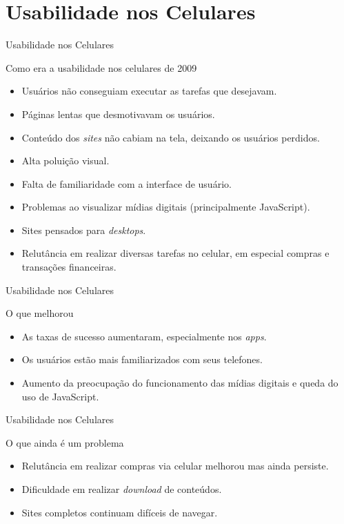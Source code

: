\section{Usabilidade nos Celulares}

\begin{frame}{Usabilidade nos Celulares}{}
\begin{block}{Como era a usabilidade nos celulares de 2009}
  \begin{itemize}
    \item<1-> Usuários não conseguiam executar as tarefas que desejavam.
    \item<2-> Páginas lentas que desmotivavam os usuários.
    \item<3-> Conteúdo dos \emph{sites} não cabiam na tela, deixando os usuários perdidos.
    \item<4-> Alta poluição visual.
    \item<5-> Falta de familiaridade com a interface de usuário.
    \item<6-> Problemas ao visualizar mídias digitais (principalmente \alert{JavaScript}).
    \item<7-> Sites pensados para \emph{desktops}.
    \item<8-> Relutância em realizar diversas tarefas no celular, em especial \alert{compras} e \alert{transações financeiras}.
  \end{itemize}
\end{block}
\end{frame}

\begin{frame}{Usabilidade nos Celulares}
\begin{block}{O que melhorou}
  \begin{itemize}
    \item<1-> As taxas de sucesso aumentaram, especialmente nos \emph{apps}.
    \item<2-> Os usuários estão mais familiarizados com seus telefones.
    \item<3-> Aumento da preocupação do funcionamento das mídias digitais e queda do uso de JavaScript.
  \end{itemize}
\end{block}
\end{frame}

\begin{frame}{Usabilidade nos Celulares}
\begin{block}{O que ainda é um problema}
  \begin{itemize}
    \item<1-> Relutância em realizar compras via celular melhorou mas ainda persiste.
    \item<2-> Dificuldade em realizar \emph{download} de conteúdos.
    \item<3-> Sites completos continuam difíceis de navegar.
  \end{itemize}
\end{block}
\end{frame}

